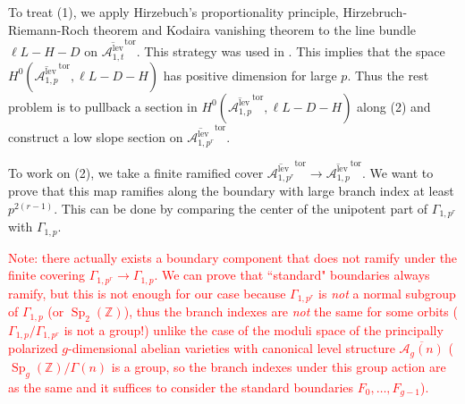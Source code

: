\documentclass[12pt, pdftex]{amsart}
\theoremstyle{plain}
\theoremstyle{definition}
\numberwithin{equation}{section}
\def\A{{\mathbb A}}
\def\Z{{\mathbb Z}}
\def\tor{\mathrm{tor}}
\def\lev{\mathrm{lev}}
\def\A{\mathcal{A}}
\def\Sp{\mathop{\mathrm{Sp}}\nolimits}
\begin{document}
To treat (1), we apply Hirzebuch's proportionality principle, Hirzebruch-Riemann-Roch theorem and Kodaira vanishing theorem to the line bundle $\ell L-H-D$ on $\overline{\A^{\lev}_{1,t}}^{\tor}$.
This strategy was used in \cite{HS94}.
This implies that the space $H^0(\overline{\A^{\lev}_{1,p}}^{\tor}, \ell L-D-H)$ has positive dimension for large $p$.
Thus the rest problem is to pullback a section in $H^0(\overline{\A^{\lev}_{1,p}}^{\tor}, \ell L-D-H)$ along (2) and construct a low slope section on $\overline{\A^{\lev}_{1,p^r}}^{\tor}$.

To work on (2), we take a finite ramified cover $\overline{\A^{\lev}_{1,p^r}}^{\tor}\to \overline{\A^{\lev}_{1,p}}^{\tor}$.
We want to prove that this map ramifies along the boundary with large branch index at least $p^{2(r-1)}$.
This can be done by comparing the center of the unipotent part of $\Gamma_{1,p^r}$ with $\Gamma_{1,p}$. 

\textcolor{red}{Note: there actually exists a boundary component that does not ramify under the finite covering $\Gamma_{1,p^r}\to\Gamma_{1,p}$.
We can prove that ``standard" boundaries always ramify, but this is not enough for our case because $\Gamma_{1,p^r}$ is \textit{not} a normal subgroup of $\Gamma_{1,p}$ (or $\Sp_2(\Z)$), thus the branch indexes are \textit{not} the same for some orbits ($\Gamma_{1,p}/\Gamma_{1,p^r}$ is not a group!) unlike the case of the moduli space of the principally polarized $g$-dimensional abelian varieties with canonical level structure $\overline{\A_g(n)}$ \cite{Rou13} ($\Sp_g(\Z)/\Gamma(n)$ is a group, so the branch indexes under this group action are as the same and it suffices to consider the standard boundaries $F_0,\dots,F_{g-1}$).}
\end{document}
